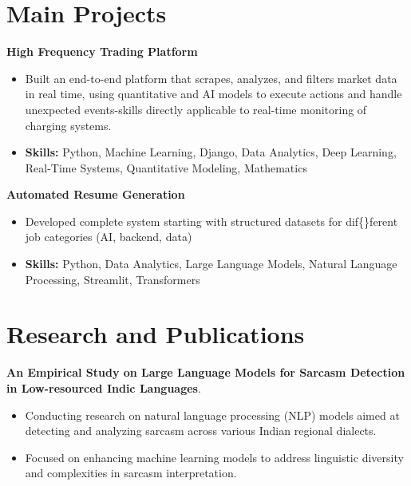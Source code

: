 \documentclass[a4paper,11pt]{article}
\begin{document}
\section{\textbf{Main Projects}}

\vspace{1mm}
  \textbf{High Frequency Trading Platform  }
\vspace{-1.5mm} %
\begin{itemize}
  \item Built an end-to-end platform that scrapes, analyzes, and filters market data in real time, using quantitative and AI models to execute actions and handle unexpected events-skills directly applicable to real-time monitoring of charging systems.
\vspace{-3mm}
  \item \textbf{Skills:} Python, Machine Learning, Django, Data Analytics, Deep Learning, Real-Time Systems, Quantitative Modeling, Mathematics
\end{itemize}


\vspace{1mm}
   \textbf{Automated Resume Generation }
\vspace{-1.5mm} %
\begin{itemize}
  \item Developed complete system starting with structured datasets for dif\{\}ferent job categories (AI, backend, data)
\vspace{-3mm}
  \item \textbf{Skills:} Python, Data Analytics, Large Language Models, Natural Language Processing, Streamlit, Transformers
\end{itemize}



\section{\textbf{Research and Publications} \hfill }
\vspace{1mm}
  \textbf{An Empirical Study on Large Language Models for Sarcasm Detection in Low-resourced Indic Languages}.
\vspace{-1mm} %
\begin{itemize}
  \item Conducting research on natural language processing (NLP) models aimed at detecting and analyzing sarcasm across various Indian regional dialects.
\vspace{-3mm}
  \item Focused on enhancing machine learning models to address linguistic diversity and complexities in sarcasm interpretation.
\end{itemize}
\end{document}
